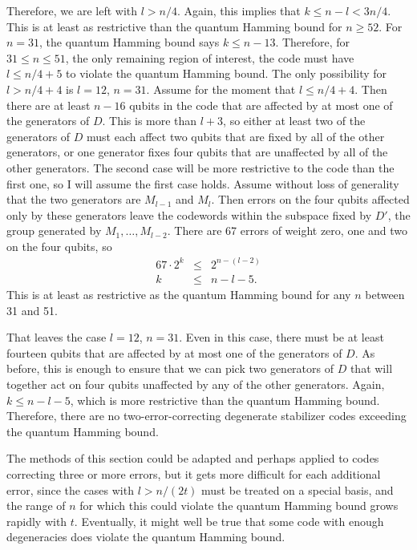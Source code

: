 \documentclass{report}
\begin{document}
Therefore, we are left with $l > n/4$.  Again, this implies that $k \leq n-l < 
3n/4$.  This is at least as restrictive than the quantum Hamming bound for $n 
\geq 52$.  For $n=31$, the quantum Hamming bound says $k \leq n-13$.  
Therefore, for $31 \leq n \leq 51$, the only remaining region of interest, 
the code must have $l \leq n/4 + 5$ to violate the quantum Hamming bound.  
The only possibility for $l > n/4 + 4$ is $l=12$, $n=31$.  Assume for the 
moment that $l \leq n/4 + 4$.  Then there are at least $n - 16$ qubits in 
the code that are affected by at most one of the generators of $D$.  This is 
more than $l+3$, so either at least two of the generators of $D$ must each
affect two qubits that are fixed by all of the other generators, or one generator fixes four qubits that are unaffected by all of the other generators. 
The second case will be more restrictive to the code than the first one, so I 
will assume the first case holds.  Assume without loss of generality that the 
two generators are $M_{l-1}$ and $M_l$.  Then errors on the four qubits 
affected only by these generators leave the codewords within the subspace fixed 
by $D'$, the group generated by $M_1, \ldots, M_{l-2}$.  There are 67 errors of 
weight zero, one and two on the four qubits, so
\begin{eqnarray}
67 \cdot 2^k & \leq & 2^{n-(l-2)} \\
k & \leq & n - l - 5.
\end{eqnarray}
This is at least as restrictive as the quantum Hamming bound for any $n$ 
between 31 and 51.

That leaves the case $l=12$, $n=31$.  Even in this case, there must be at 
least fourteen qubits that are affected by at most one of the generators of 
$D$.  As before, this is enough to ensure that we can pick two generators of 
$D$ that will together act on four qubits unaffected by any of the other 
generators.  Again, $k \leq n - l - 5$, which is more restrictive than the quantum Hamming bound.  Therefore, there are no two-error-correcting degenerate 
stabilizer codes exceeding the quantum Hamming bound.

The methods of this section could be adapted and perhaps applied to codes 
correcting three or more errors, but it gets more difficult for each 
additional error, since the cases with $l > n/(2t)$ must be treated on a 
special basis, and the range of $n$ for which this could violate the 
quantum Hamming bound grows rapidly with $t$.  Eventually, it might 
well be true that some code with enough degeneracies does violate the 
quantum Hamming bound.
\end{document}
